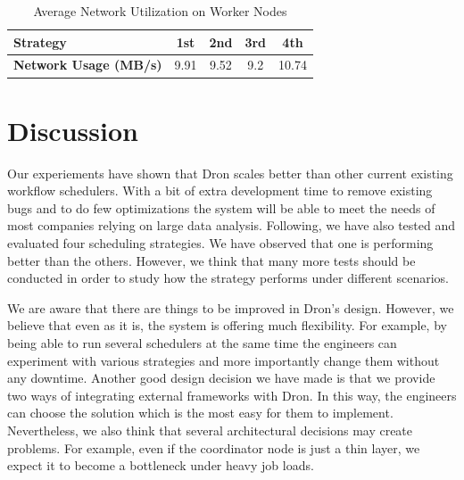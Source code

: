 \documentclass[11pt,a4paper,twoside]{report}
\begin{document}
\begin{table}[h]
\centering
\begin{tabular}{|l|c|c|c|c|}
\hline
\textbf{Strategy} & \textbf{1st} & \textbf{2nd} & \textbf{3rd} & \textbf{4th} \\ \hline
\textbf{Network Usage (MB/s)} & 9.91 & 9.52 & 9.2 & 10.74 \\ \hline
\end{tabular}
\caption{Average Network Utilization on Worker Nodes}
\label{tab:NetSpeed}
\end{table}




\section{Discussion}
Our experiements have shown that Dron scales better than other current existing workflow schedulers. With a bit of extra development time to remove existing bugs and to do few optimizations the system will be able to meet the needs of most companies relying on large data analysis. Following, we have also tested and evaluated four scheduling strategies. We have observed that one is performing better than the others. However, we think that many more tests should be conducted in order to study how the strategy performs under different scenarios.


We are aware that there are things to be improved in Dron's design. However, we believe that even as it is, the system is offering much flexibility. For example, by being able to run several schedulers at the same time the engineers can experiment with various strategies and more importantly change them without any downtime. Another good design decision we have made is that we provide two ways of integrating external frameworks with Dron. In this way, the engineers can choose the solution which is the most easy for them to implement. Nevertheless, we also think that several architectural decisions may create problems. For example, even if the coordinator node is just a thin layer, we expect it to become a bottleneck under heavy job loads.
\end{document}

